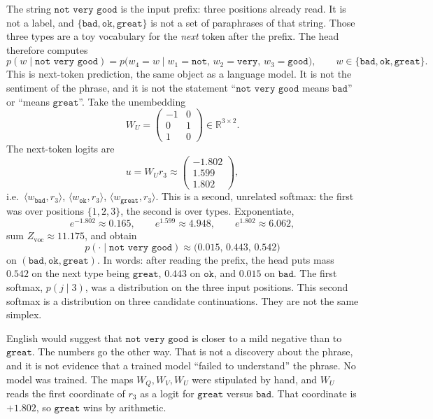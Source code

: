 \documentclass[11pt,a4paper]{article}
\theoremstyle{definition}
\begin{document}
\begin{example}
The string \(\texttt{not very good}\) is the input prefix: three positions already read. It is not a label, and \(\{\texttt{bad},\texttt{ok},\texttt{great}\}\) is not a set of paraphrases of that string. Those three types are a toy vocabulary for the \emph{next} token after the prefix. The head therefore computes
\[
p(w\mid\texttt{not very good})
=p\bigl(w_4=w\mid w_1=\texttt{not},\,w_2=\texttt{very},\,w_3=\texttt{good}\bigr),
\qquad
w\in\{\texttt{bad},\texttt{ok},\texttt{great}\}.
\]
This is next-token prediction, the same object as a language model. It is not the sentiment of the phrase, and it is not the statement ``\(\texttt{not very good}\) means \(\texttt{bad}\)'' or ``means \(\texttt{great}\)''. Take the unembedding
\[
W_U
=\begin{pmatrix}
-1&0\\
0&1\\
1&0
\end{pmatrix}
\in\mathbb{R}^{3\times 2}.
\]
The next-token logits are
\[
u=W_U r_3
\approx
\begin{pmatrix}-1.802\\1.599\\1.802\end{pmatrix},
\]
i.e.\ \(\langle w_{\texttt{bad}},r_3\rangle\), \(\langle w_{\texttt{ok}},r_3\rangle\), \(\langle w_{\texttt{great}},r_3\rangle\). This is a second, unrelated softmax: the first was over positions \(\{1,2,3\}\), the second is over types. Exponentiate,
\[
e^{-1.802}\approx 0.165,
\qquad
e^{1.599}\approx 4.948,
\qquad
e^{1.802}\approx 6.062,
\]
sum \(Z_{\mathrm{voc}}\approx 11.175\), and obtain
\[
p(\cdot\mid\texttt{not very good})
\approx
\bigl(0.015,\,0.443,\,0.542\bigr)
\]
on \((\texttt{bad},\texttt{ok},\texttt{great})\). In words: after reading the prefix, the head puts mass \(0.542\) on the next type being \(\texttt{great}\), \(0.443\) on \(\texttt{ok}\), and \(0.015\) on \(\texttt{bad}\). The first softmax, \(p(j\mid 3)\), was a distribution on the three input positions. This second softmax is a distribution on three candidate continuations. They are not the same simplex.

English would suggest that \(\texttt{not very good}\) is closer to a mild negative than to \(\texttt{great}\). The numbers go the other way. That is not a discovery about the phrase, and it is not evidence that a trained model ``failed to understand'' the phrase. No model was trained. The maps \(W_Q,W_V,W_U\) were stipulated by hand, and \(W_U\) reads the first coordinate of \(r_3\) as a logit for \(\texttt{great}\) versus \(\texttt{bad}\). That coordinate is \(+1.802\), so \(\texttt{great}\) wins by arithmetic.


\end{example}
\end{document}
